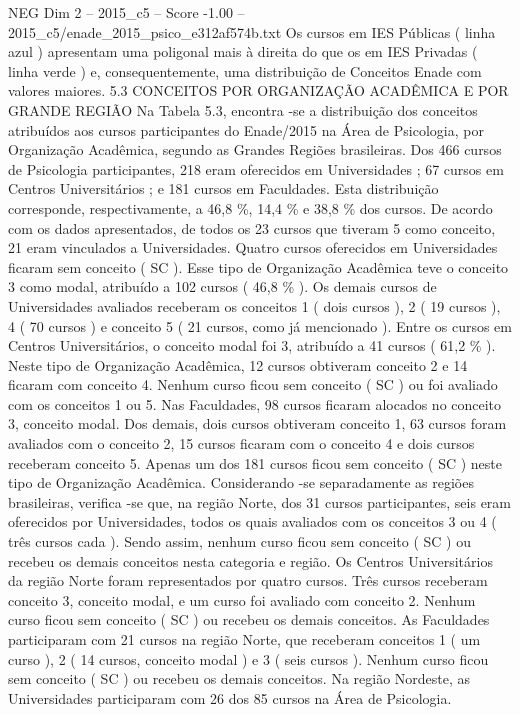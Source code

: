 \begin{textsample}{NEG Dim 2 – 2015\_c5 – Score -1.00 – 2015\_c5/enade\_2015\_psico\_e312af574b.txt}
Os cursos em IES Públicas ( linha azul ) apresentam uma poligonal mais à direita do que os em IES Privadas ( linha verde ) e, consequentemente, uma distribuição de Conceitos Enade com valores maiores. 5.3 CONCEITOS POR ORGANIZAÇÃO ACADÊMICA E POR GRANDE REGIÃO Na Tabela 5.3, encontra -se a distribuição dos conceitos atribuídos aos cursos participantes do Enade/2015 na Área de Psicologia, por Organização Acadêmica, segundo as Grandes Regiões brasileiras.
Dos 466 cursos de Psicologia participantes, 218 eram oferecidos em Universidades ; 67 cursos em Centros Universitários ; e 181 cursos em Faculdades.
Esta distribuição corresponde, respectivamente, a 46,8 \%, 14,4 \% e 38,8 \% dos cursos.
De acordo com os dados apresentados, de todos os 23 cursos que tiveram 5 como conceito, 21 eram vinculados a Universidades.
Quatro cursos oferecidos em Universidades ficaram sem conceito ( SC ).
Esse tipo de Organização Acadêmica teve o conceito 3 como modal, atribuído a 102 cursos ( 46,8 \% ).
Os demais cursos de Universidades avaliados receberam os conceitos 1 ( dois cursos ), 2 ( 19 cursos ), 4 ( 70 cursos ) e conceito 5 ( 21 cursos, como já mencionado ).
Entre os cursos em Centros Universitários, o conceito modal foi 3, atribuído a 41 cursos ( 61,2 \% ).
Neste tipo de Organização Acadêmica, 12 cursos obtiveram conceito 2 e 14 ficaram com conceito 4.
Nenhum curso ficou sem conceito ( SC ) ou foi avaliado com os conceitos 1 ou 5.
Nas Faculdades, 98 cursos ficaram alocados no conceito 3, conceito modal.
Dos demais, dois cursos obtiveram conceito 1, 63 cursos foram avaliados com o conceito 2, 15 cursos ficaram com o conceito 4 e dois cursos receberam conceito 5.
Apenas um dos 181 cursos ficou sem conceito ( SC ) neste tipo de Organização Acadêmica.
Considerando -se separadamente as regiões brasileiras, verifica -se que, na região Norte, dos 31 cursos participantes, seis eram oferecidos por Universidades, todos os quais avaliados com os conceitos 3 ou 4 ( três cursos cada ).
Sendo assim, nenhum curso ficou sem conceito ( SC ) ou recebeu os demais conceitos nesta categoria e região.
Os Centros Universitários da região Norte foram representados por quatro cursos.
Três cursos receberam conceito 3, conceito modal, e um curso foi avaliado com conceito 2.
Nenhum curso ficou sem conceito ( SC ) ou recebeu os demais conceitos.
As Faculdades participaram com 21 cursos na região Norte, que receberam conceitos 1 ( um curso ), 2 ( 14 cursos, conceito modal ) e 3 ( seis cursos ).
Nenhum curso ficou sem conceito ( SC ) ou recebeu os demais conceitos.
Na região Nordeste, as Universidades participaram com 26 dos 85 cursos na Área de Psicologia.

\end{textsample}
